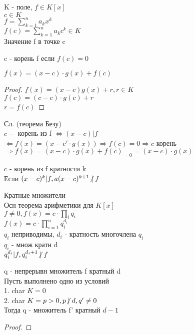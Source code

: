 K - поле, $ f \in K[x] $ \\
$ c \in K$ \\
$ f = \sum_{k=1}^{n} a_kx^k $ \\
$ f(c) = \sum_{k=1}^{n} a_kc^k \in K $ \\
Значение f в точке c \\
\begin{definition}
	c - корень f если $f(c) = 0$ \\
\end{definition}
\begin{theorem}
	$ f(x) = (x-c)\cdot g(x) + f(c)$ \\
	\begin{proof}
		$ f(x) = (x-c) g(x) + r, r \in K $\\
		$ f(c) = (c - c) \cdot g(c) + r $ \\
		$ r= f(c)$
	\end{proof}
\end{theorem}
Сл. (теорема Безу) \\
$ c - $ корень из f $ \Leftrightarrow (x - c) | f $ \\
$ \Leftarrow f(x) = (x-c' \cdot g(x)) \Rightarrow f(c) = 0 \Rightarrow c $ корень \\
$ \Rightarrow f(x) = (x-c)\cdot g(x) + f(c)_{=0} = (x-c) \cdot g(x) $ \\
\begin{definition}
	c - корень из f кратности k \\
	Если $ (x-c)^k|f, a (x-c)^{k+1} \centernot| f $ \\
\end{definition}
Кратные множители \\
Осн теорема арифметики для $K[x]$\\
$ f \neq 0, f(x) = c \cdot \prod_{i} q_i $ \\
$ f(x) = c \cdot \prod_{i=1}^{n} q_i^{d_i} $ \\
$ q_i $ неприводимы, $ d_i $ - кратность многочлена $ q_i $\\
$ q_i $ - множ кратн d \\
$ q_i^{d_i} | f, q_i^{d_i+1} \centernot| f $ \\
\begin{theorem}
	q - непрерывн множитель f кратный d \\
	Пусть выполнено одно из условий \\
	1. char $K = 0$ \\
	2. char $K = p > 0, p \centernot| d, q' \neq 0$  \\
	Тогда q - множитель f' кратный $d-1$ \\
	\begin{proof}
	\end{proof}
\end{theorem}
